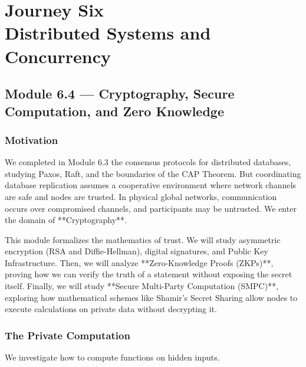 \documentclass[12pt, a4paper]{book}
\begin{document}
\setcounter{chapter}{5}
\chapter[Journey 6 --- Distributed Systems and Concurrency]
        {Journey Six\\[8pt]
         \textcolor{ModuleColor}{\large Distributed Systems and Concurrency}}
\setcounter{section}{3}

\section{Module 6.4 --- Cryptography, Secure Computation, and Zero Knowledge}
\label{sec:mod6.4}

\subsection*{Motivation}

We completed in Module 6.3 the consensus protocols for distributed databases, studying Paxos, Raft, and the boundaries of the CAP Theorem.
But coordinating database replication assumes a cooperative environment where network channels are safe and nodes are trusted.
In physical global networks, communication occurs over compromised channels, and participants may be untrusted.
We enter the domain of **Cryptography**.

This module formalizes the mathematics of trust.
We will study asymmetric encryption (RSA and Diffie-Hellman), digital signatures, and Public Key Infrastructure.
Then, we will analyze **Zero-Knowledge Proofs (ZKPs)**, proving how we can verify the truth of a statement without exposing the secret itself.
Finally, we will study **Secure Multi-Party Computation (SMPC)**, exploring how mathematical schemes like Shamir's Secret Sharing allow nodes to execute calculations on private data without decrypting it.

\subsection{The Private Computation}

We investigate how to compute functions on hidden inputs.
\end{document}
